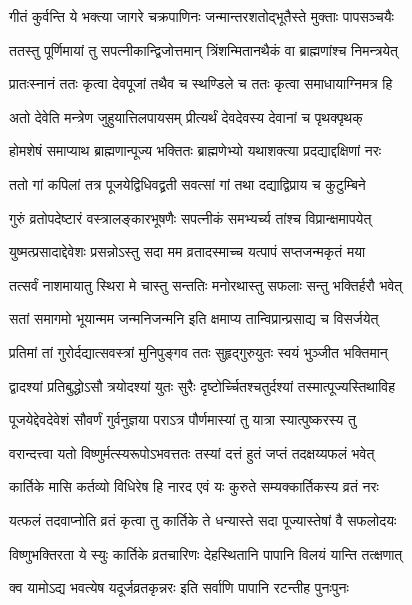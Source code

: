 \twolineshloka
{गीतं कुर्वन्ति ये भक्त्या जागरे चक्रपाणिनः}
{जन्मान्तरशतोद्भूतैस्ते मुक्ताः पापसञ्चयैः} %

\twolineshloka
{ततस्तु पूर्णिमायां तु सपत्नीकान्द्विजोत्तमान्}
{त्रिंशन्मितानथैकं वा ब्राह्मणांश्च निमन्त्रयेत्} %

\twolineshloka
{प्रातःस्नानं ततः कृत्वा देवपूजां तथैव च}
{स्थण्डिले च ततः कृत्वा समाधायाग्निमत्र हि} %

\twolineshloka
{अतो देवेति मन्त्रेण जुहुयात्तिलपायसम्}
{प्रीत्यर्थं देवदेवस्य देवानां च पृथक्पृथक्} %

\twolineshloka
{होमशेषं समाप्याथ ब्राह्मणान्पूज्य भक्तितः}
{ब्राह्मणेभ्यो यथाशक्त्या प्रदद्याद्दक्षिणां नरः} %

\twolineshloka
{ततो गां कपिलां तत्र पूजयेद्विधिवद्व्रती}
{सवत्सां गां तथा दद्याद्विप्राय च कुटुम्बिने} %

\twolineshloka
{गुरुं व्रतोपदेष्टारं वस्त्रालङ्कारभूषणैः}
{सपत्नीकं समभ्यर्च्य तांश्च विप्रान्क्षमापयेत्} %

\twolineshloka
{युष्मत्प्रसादाद्देवेशः प्रसन्नोऽस्तु सदा मम}
{व्रतादस्माच्च यत्पापं सप्तजन्मकृतं मया} %

\twolineshloka
{तत्सर्वं नाशमायातु स्थिरा मे चास्तु सन्ततिः}
{मनोरथास्तु सफलाः सन्तु भक्तिर्हरौ भवेत्} %

\twolineshloka
{सतां समागमो भूयान्मम जन्मनिजन्मनि}
{इति क्षमाप्य तान्विप्रान्प्रसाद्य च विसर्जयेत्} %

\twolineshloka
{प्रतिमां तां गुरोर्दद्यात्सवस्त्रां मुनिपुङ्गव}
{ततः सुहृद्गुरुयुतः स्वयं भुञ्जीत भक्तिमान्} %

\twolineshloka
{द्वादश्यां प्रतिबुद्धोऽसौ त्रयोदश्यां युतः सुरैः}
{दृष्टोर्च्चितश्चतुर्दश्यां तस्मात्पूज्यस्तिथाविह} %

\twolineshloka
{पूजयेद्देवदेवेशं सौवर्णं गुर्वनुज्ञया}
{पराऽत्र पौर्णमास्यां तु यात्रा स्यात्पुष्करस्य तु} %

\twolineshloka
{वरान्दत्त्वा यतो विष्णुर्मत्स्यरूपोऽभवत्ततः}
{तस्यां दत्तं हुतं जप्तं तदक्षय्यफलं भवेत्} %

\twolineshloka
{कार्तिके मासि कर्तव्यो विधिरेष हि नारद}
{एवं यः कुरुते सम्यक्कार्तिकस्य व्रतं नरः} %

\twolineshloka
{यत्फलं तदवाप्नोति व्रतं कृत्वा तु कार्तिके}
{ते धन्यास्ते सदा पूज्यास्तेषां वै सफलोदयः} %

\twolineshloka
{विष्णुभक्तिरता ये स्युः कार्तिके व्रतचारिणः}
{देहस्थितानि पापानि विलयं यान्ति तत्क्षणात्} %

\twolineshloka
{क्व यामोऽद्य भवत्येष यदूर्जव्रतकृन्नरः}
{इति सर्वाणि पापानि रटन्तीह पुनःपुनः} %

